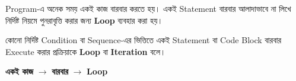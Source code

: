 
Program-এ অনেক সময় একই কাজ বারবার করতে হয়।
একই Statement বারবার আলাদাভাবে না লিখে নির্দিষ্ট নিয়মে
পুনরাবৃত্তি করার জন্য \textbf{Loop} ব্যবহার করা হয়।



\begin{definitionbox}

কোনো নির্দিষ্ট Condition বা Sequence-এর ভিত্তিতে একই Statement
বা Code Block বারবার Execute করার প্রক্রিয়াকে
\textbf{Loop} বা \textbf{Iteration} বলে।

\end{definitionbox}

\begin{center}

\textbf{একই কাজ}
\(\longrightarrow\)
\textbf{বারবার}
\(\longrightarrow\)
\textbf{Loop}

\end{center}


